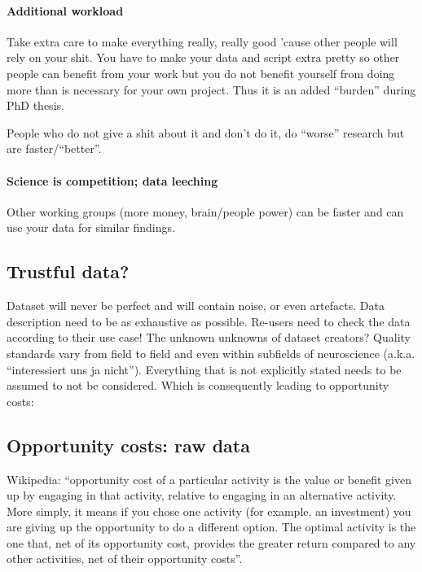 \paragraph{Additional workload}
%
Take extra care to make everything really, really good 'cause other people will
rely on your shit.
%
You have to make your data and script extra pretty so other people can benefit
from your work but you do not benefit yourself from doing more than is necessary
for your own project.
%
Thus it is an added ``burden'' during PhD thesis.

%
People who do not give a shit about it and don't do it, do ``worse'' research
but are faster/``better''.


\paragraph{Science is competition; data leeching}
%
Other working groups (more money, brain/people power) can be faster and can use
your data for similar findings.


\subsection{Trustful data?}


%
Dataset will never be perfect and will contain noise, or even artefacts.
%
Data description need to be as exhaustive as possible.
%
Re-users need to check the data according to their use case!
%
The unknown unknowns of dataset creators?
%
Quality standards vary from field to field and even within subfields of
neuroscience (a.k.a. ``interessiert uns ja nicht'').
%
Everything that is not explicitly stated needs to be assumed to not be
considered.
%
Which is consequently leading to opportunity costs:


\subsection{Opportunity costs: raw data}

Wikipedia: ``opportunity cost of a particular activity is the value or benefit
given up by engaging in that activity, relative to engaging in an alternative
activity.
%
More simply, it means if you chose one activity (for example, an investment) you
are giving up the opportunity to do a different option.
%
The optimal activity is the one that, net of its opportunity cost, provides the
greater return compared to any other activities, net of their opportunity
costs''.

